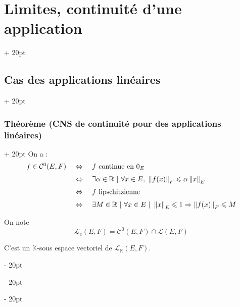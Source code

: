 \documentclass[a4paper, 12pt, twoside]{article}
\newcommand{\R}{\mathbb{R}} %
\newcommand{\K}{\mathbb K}
\newcommand{\norm}[1]{\left\lVert #1 \right\rVert}
\newcommand{\ssi}{\ \Leftrightarrow \ }
\renewcommand{\le}{\leqslant}
\newcommand{\ind}[1][20pt]{\advance\leftskip + #1}
\newcommand{\deind}[1][20pt]{\advance\leftskip - #1}
\newenvironment{indt}[2][20pt]{#2 \par \ind[#1]}{\par \deind} %
\begin{document}
\begin{indt}{\section{Limites, continuité d'une application}}
\begin{indt}{\subsection{Cas des applications linéaires}}
\begin{indt}{\subsubsection{Théorème (CNS de continuité pour des applications linéaires)}}
                On a :
                \[
                    \begin{array}{rcl}
                        f \in \mathcal C^0(E, F)
                        &\ssi&
                        f\ \text{continue en}\ 0_E
                        \vspace{6pt}
                        \\
                        &\ssi&
                        \exists \alpha \in \R\ |\ \forall x \in E,\ \norm{f(x)}_F \le \alpha \norm x _E
                        \vspace{6pt}
                        \\
                        &\ssi&
                        f\ \text{lipschitzienne}
                        \vspace{6pt}
                        \\
                        &\ssi&
                        \exists M \in \R\ |\ \forall x \in E\ |\
                        \norm x _E \le 1 \Rightarrow \norm{f(x)}_F \le M
                    \end{array}
                \]

                \vspace{12pt}
                
                On note
                \[
                    \mathcal L_c(E, F) = \mathcal C^0(E, F) \cap \mathcal L(E, F)
                \]

                C'est un $\K$-sous espace vectoriel de $\mathcal L_\K(E, F)$.
            \end{indt}

            \vspace{12pt}
            

\end{indt}
\end{indt}
\end{document}
